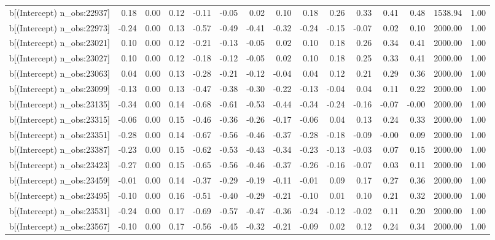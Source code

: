 \begin{table}[ht]
\begin{tabular}{rrrrrrrrrrrrrrr}
  b[(Intercept) n\_obs:22937] & 0.18 & 0.00 & 0.12 & -0.11 & -0.05 & 0.02 & 0.10 & 0.18 & 0.26 & 0.33 & 0.41 & 0.48 & 1538.94 & 1.00 \\ 
  b[(Intercept) n\_obs:22973] & -0.24 & 0.00 & 0.13 & -0.57 & -0.49 & -0.41 & -0.32 & -0.24 & -0.15 & -0.07 & 0.02 & 0.10 & 2000.00 & 1.00 \\ 
  b[(Intercept) n\_obs:23021] & 0.10 & 0.00 & 0.12 & -0.21 & -0.13 & -0.05 & 0.02 & 0.10 & 0.18 & 0.26 & 0.34 & 0.41 & 2000.00 & 1.00 \\ 
  b[(Intercept) n\_obs:23027] & 0.10 & 0.00 & 0.12 & -0.18 & -0.12 & -0.05 & 0.02 & 0.10 & 0.18 & 0.25 & 0.33 & 0.41 & 2000.00 & 1.00 \\ 
  b[(Intercept) n\_obs:23063] & 0.04 & 0.00 & 0.13 & -0.28 & -0.21 & -0.12 & -0.04 & 0.04 & 0.12 & 0.21 & 0.29 & 0.36 & 2000.00 & 1.00 \\ 
  b[(Intercept) n\_obs:23099] & -0.13 & 0.00 & 0.13 & -0.47 & -0.38 & -0.30 & -0.22 & -0.13 & -0.04 & 0.04 & 0.11 & 0.22 & 2000.00 & 1.00 \\ 
  b[(Intercept) n\_obs:23135] & -0.34 & 0.00 & 0.14 & -0.68 & -0.61 & -0.53 & -0.44 & -0.34 & -0.24 & -0.16 & -0.07 & -0.00 & 2000.00 & 1.00 \\ 
  b[(Intercept) n\_obs:23315] & -0.06 & 0.00 & 0.15 & -0.46 & -0.36 & -0.26 & -0.17 & -0.06 & 0.04 & 0.13 & 0.24 & 0.33 & 2000.00 & 1.00 \\ 
  b[(Intercept) n\_obs:23351] & -0.28 & 0.00 & 0.14 & -0.67 & -0.56 & -0.46 & -0.37 & -0.28 & -0.18 & -0.09 & -0.00 & 0.09 & 2000.00 & 1.00 \\ 
  b[(Intercept) n\_obs:23387] & -0.23 & 0.00 & 0.15 & -0.62 & -0.53 & -0.43 & -0.34 & -0.23 & -0.13 & -0.03 & 0.07 & 0.15 & 2000.00 & 1.00 \\ 
  b[(Intercept) n\_obs:23423] & -0.27 & 0.00 & 0.15 & -0.65 & -0.56 & -0.46 & -0.37 & -0.26 & -0.16 & -0.07 & 0.03 & 0.11 & 2000.00 & 1.00 \\ 
  b[(Intercept) n\_obs:23459] & -0.01 & 0.00 & 0.14 & -0.37 & -0.29 & -0.19 & -0.11 & -0.01 & 0.09 & 0.17 & 0.27 & 0.36 & 2000.00 & 1.00 \\ 
  b[(Intercept) n\_obs:23495] & -0.10 & 0.00 & 0.16 & -0.51 & -0.40 & -0.29 & -0.21 & -0.10 & 0.01 & 0.10 & 0.21 & 0.32 & 2000.00 & 1.00 \\ 
  b[(Intercept) n\_obs:23531] & -0.24 & 0.00 & 0.17 & -0.69 & -0.57 & -0.47 & -0.36 & -0.24 & -0.12 & -0.02 & 0.11 & 0.20 & 2000.00 & 1.00 \\ 
  b[(Intercept) n\_obs:23567] & -0.10 & 0.00 & 0.17 & -0.56 & -0.45 & -0.32 & -0.21 & -0.09 & 0.02 & 0.12 & 0.24 & 0.34 & 2000.00 & 1.00 \\ 

\end{tabular}
\end{table}
